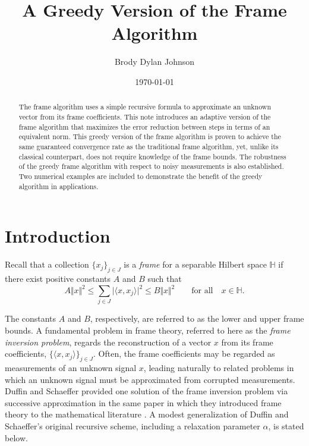 \documentclass[11pt]{amsart}
\title{A Greedy Version of the Frame Algorithm}
\author{Brody Dylan Johnson}
\date{\today}
\newcounter{Theorem}
\numberwithin{Theorem}{section}
\theoremstyle{definition}
\begin{document}
\begin{abstract}
The frame algorithm uses a simple recursive formula to approximate an unknown vector from its frame coefficients.  This note introduces an adaptive version of the frame algorithm that maximizes the error reduction between steps in terms of an equivalent norm.  This greedy version of the frame algorithm is proven to achieve the same guaranteed convergence rate as the traditional frame algorithm, yet, unlike its classical counterpart, does not require knowledge of the frame bounds.  The robustness of the greedy frame algorithm with respect to noisy measurements is also established.  Two numerical examples are included to demonstrate the benefit of the greedy algorithm in applications.
\end{abstract}


\maketitle

\section{Introduction} \label{section:1}

Recall that a collection $\lbrace x_{j} \rbrace_{j\in J}$ is a \emph{frame} for a separable Hilbert space $\mathbb{H}$ if there exist positive constants $A$ and $B$ such that 
$$ A \Vert x\Vert^{2} \le \sum_{j\in J} \vert \langle x, x_{j} \rangle \vert^{2} \le B \Vert x\Vert^{2} \qquad \text{for all} \quad x\in \mathbb{H}. $$

\noindent
The constants $A$ and $B$, respectively, are referred to as the lower and upper frame bounds.  A fundamental problem in frame theory, referred to here as the \emph{frame inversion problem}, regards the reconstruction of a vector $x$ from its frame coefficients, $\lbrace \langle x, x_{j} \rangle \rbrace_{j\in J}$.  Often, the frame coefficients may be regarded as measurements of an unknown signal $x$, leading naturally to related problems in which an unknown signal must be approximated from corrupted measurements.  Duffin and Schaeffer provided one solution of the frame inversion problem via successive approximation in the same paper in which they introduced frame theory to the mathematical literature \cite[Theorem III]{DuffinSchaeffer1952}.  A modest generalization of Duffin and Schaeffer's original recursive scheme, including a relaxation parameter $\alpha$, is stated below.
\end{document}
